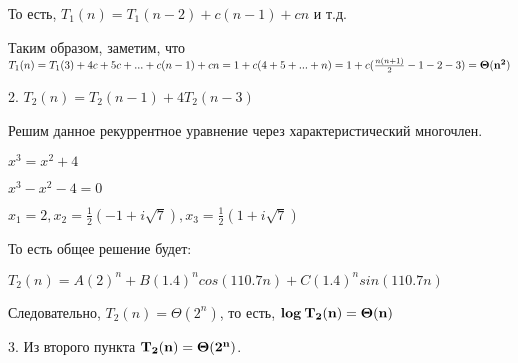 \documentclass[12pt]{extreport}
\begin{document}
То есть, $T_1(n) = T_1(n-2) + c(n-1) + cn$ и т.д.

Таким образом, заметим, что $T_1(n) = T_1(3) + 4c + 5c + ... + c(n-1) + cn = 1 + c(4+5+...+n) = 1+ c(\frac{n(n+1)}{2} - 1-2-3) = \bf{\Theta(n^2)}$ 

2. $T_2(n) = T_2(n-1) + 4T_2(n-3)$ 

Решим данное рекуррентное уравнение через характеристический многочлен. 

$x^3=x^2+4$

$x^3-x^2-4=0$

$x_1=2, x_2=\frac{1}{2} (-1 + i\sqrt7), x_3=\frac{1}{2} (1 + i\sqrt7)$

То есть общее решение будет: 

$T_2(n) = A(2)^n + B(1.4)^ncos(110.7n) + C(1.4)^nsin(110.7n)$ 

Следовательно, $T_2(n)=\Theta(2^n)$, то есть, ${\bf log \:T_2(n) = \Theta(n)}$

3. Из второго пункта ${\bf T_2(n)=\Theta(2^n)}$.
\end{document}
